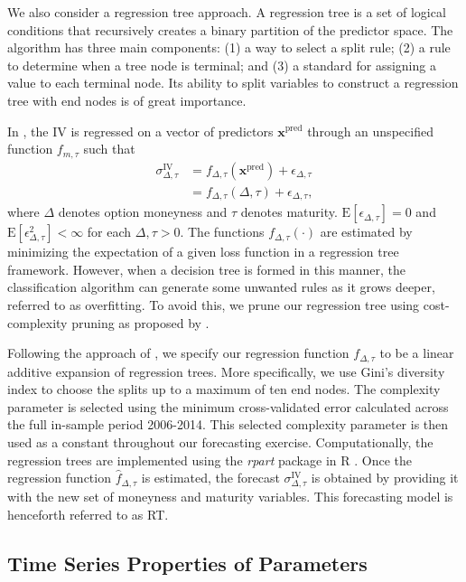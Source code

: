 \documentclass[12pt,a4paper]{article}
\begin{document}
We also consider a regression tree approach. A regression tree is a set of logical conditions that recursively creates a binary partition of the predictor space. The algorithm has three main components: (1) a way to select a split rule; (2) a rule to determine when a tree node is terminal; and (3) a standard for assigning a value to each terminal node. Its ability to split variables to construct a regression tree with end nodes is of great importance. 

In \cite{AC10}, the IV is regressed on a vector of predictors $\bm{x}^{\text{pred}}$ through an unspecified function $f_{m,\tau}$ such that
\begin{align*}
\sigma_{\Delta, \tau}^{\text{IV}} &= f_{\Delta,\tau}\left(\bm{x}^{\text{pred}}\right)+\epsilon_{\Delta,\tau} \\
&=f_{\Delta, \tau}\left(\Delta, \tau\right)+\epsilon_{\Delta, \tau},
\end{align*}
where $\Delta$ denotes option moneyness and $\tau$ denotes maturity. $\text{E}[\epsilon_{\Delta,\tau}] = 0$ and $\text{E}[\epsilon_{\Delta,\tau}^2]<\infty$ for each $\Delta, \tau>0$. The functions $f_{\Delta, \tau}(\cdot)$ are estimated by minimizing the expectation of a given loss function in a regression tree framework. However, when a decision tree is formed in this manner, the classification algorithm can generate some unwanted rules as it grows deeper, referred to as overfitting. To avoid this, we prune our regression tree using cost-complexity pruning as proposed by \cite{BFO+84} \citep[see][for further technical details]{EMS97}.

Following the approach of \cite{AC10}, we specify our regression function $f_{\Delta, \tau}$ to be a linear additive expansion of regression trees. More specifically, we use Gini's diversity index to choose the splits up to a maximum of ten end nodes. The complexity parameter is selected using the minimum cross-validated error calculated across the full in-sample period 2006-2014. This selected complexity parameter is then used as a constant throughout our forecasting exercise. Computationally, the regression trees are implemented using the \textit{rpart} package \citep{TA18} in R \citep{Team18}. Once the regression function $\widehat{f}_{\Delta, \tau}$ is estimated, the forecast $\sigma_{\Delta, \tau}^{\text{IV}}$ is obtained by providing it with the new set of moneyness and maturity variables. This forecasting model is henceforth referred to as RT.


\subsection{Time Series Properties of Parameters}\label{subsec:Forecast Evaluation}
\end{document}
